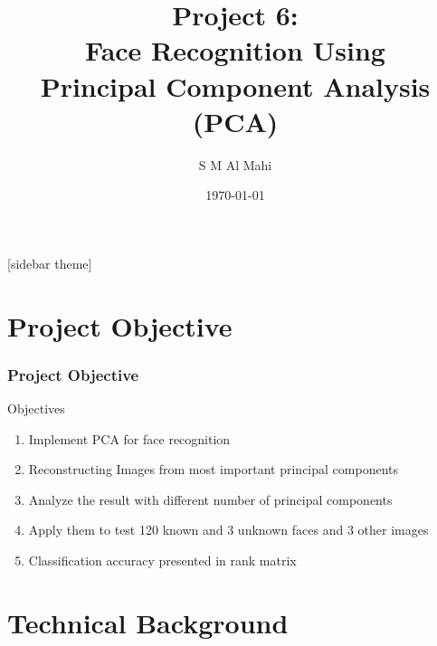 \documentclass[11pt]{beamer}
\author{S M Al Mahi}
\title[ECEN-5283 Computer Vision]{Project 6: \\Face Recognition Using\\Principal Component Analysis (\textbf{PCA})}
\institute{Oklahoma State University}
\date{\today}
\begin{document}
\begin{frame}
\titlepage
\end{frame}

\newpage
{}[sidebar theme]
\section{Project Objective}
\begin{frame}
\frametitle{Project Objective}
	\begin{block}{Objectives}
	\begin{enumerate}
		\item Implement PCA for face recognition
		\item Reconstructing Images from most important principal components 
		\item Analyze the result with different number of principal components
		\item Apply them to test 120 known and 3 unknown faces and 3 other images
    \item Classification accuracy presented in rank matrix
	\end{enumerate}
	\end{block}
\end{frame}

\section{Technical Background}
\end{document}
